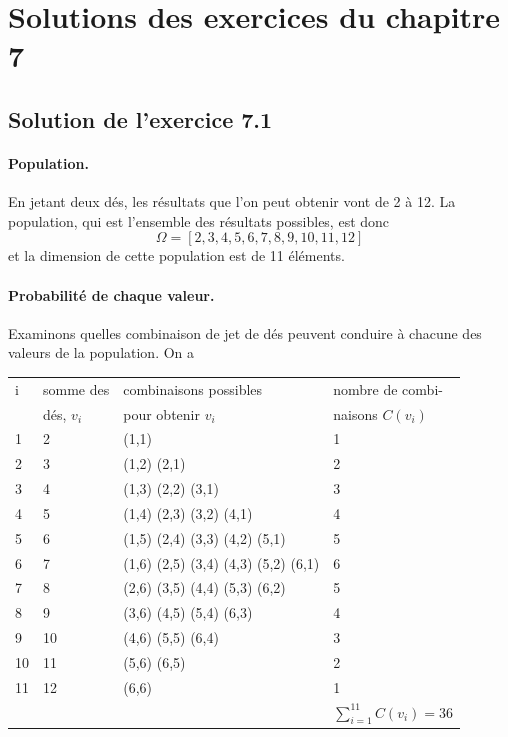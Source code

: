 \section{Solutions des exercices du chapitre 7}

\subsection*{Solution de l'exercice 7.1}

\paragraph{Population.} En jetant deux dés, les résultats que l'on peut obtenir vont de 2 à 12. La population, qui est l'ensemble des résultats possibles, est donc
$$
\Omega=[2,3,4,5,6,7,8,9,10,11,12]
$$
et la dimension de cette population est de 11 éléments.

\paragraph{Probabilité de chaque valeur.} Examinons quelles combinaison de jet de dés peuvent conduire à chacune des valeurs de la population. On a
\begin{center}
\begin{tabular}{llll}
i & somme des & combinaisons possibles & nombre de combi- \\
& dés, $v_i$ & pour obtenir $v_i$ & naisons $C(v_i)$\\ \hline
1 & 2 & (1,1) & 1 \\
2 & 3 & (1,2) (2,1) & 2 \\
3 & 4 & (1,3) (2,2) (3,1) & 3 \\
4 & 5 & (1,4) (2,3) (3,2) (4,1) & 4 \\
5 & 6 & (1,5) (2,4) (3,3) (4,2) (5,1) & 5 \\
6 & 7 & (1,6) (2,5) (3,4) (4,3) (5,2) (6,1) & 6\\
7 & 8 & (2,6) (3,5) (4,4) (5,3) (6,2) & 5 \\
8 & 9 & (3,6) (4,5) (5,4) (6,3) & 4 \\
9 & 10 & (4,6) (5,5) (6,4) & 3 \\
10 & 11 & (5,6) (6,5) & 2 \\
11 & 12 & (6,6) & 1 \\\hline
& & & $\sum_{i=1}^{11}C(v_i)=36$
\end{tabular}
\end{center}

